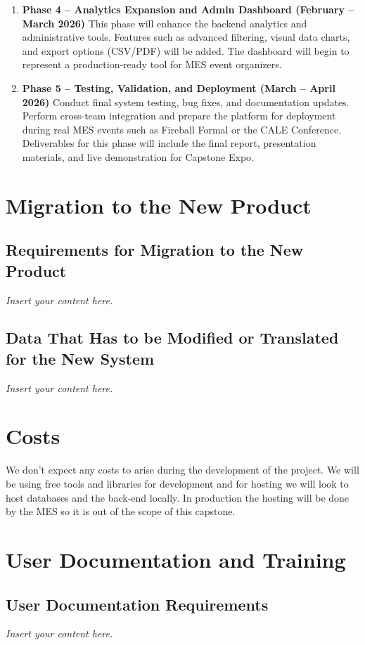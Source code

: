 \documentclass[12pt]{article}
\newcommand{\lips}{\textit{Insert your content here.}}
\begin{document}
\begin{enumerate}
    \item \textbf{Phase 4 – Analytics Expansion and Admin Dashboard (February – March 2026)}  
    This phase will enhance the backend analytics and administrative tools.  
    Features such as advanced filtering, visual data charts, and export options (CSV/PDF) will be added.  
    The dashboard will begin to represent a production-ready tool for MES event organizers.
    
    \item \textbf{Phase 5 – Testing, Validation, and Deployment (March – April 2026)}  
    Conduct final system testing, bug fixes, and documentation updates.  
    Perform cross-team integration and prepare the platform for deployment during real MES events such as Fireball Formal or the CALE Conference.  
    Deliverables for this phase will include the final report, presentation materials, and live demonstration for Capstone Expo.
\end{enumerate}

\section{Migration to the New Product}
\subsection{Requirements for Migration to the New Product}
\lips
\subsection{Data That Has to be Modified or Translated for the New System}
\lips

\section{Costs}
We don't expect any costs to arise during the development of the project. We will be using free tools and libraries for development and for hosting we will look to host databases and the back-end locally. In production the hosting will be done by the MES so it is out of the scope of this capstone.
\section{User Documentation and Training}
\subsection{User Documentation Requirements}
\lips
\end{document}

